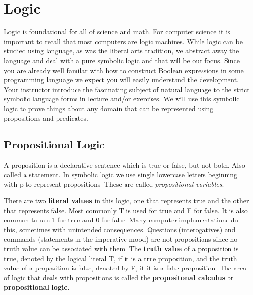\chapter {Logic}
Logic is foundational for all of science and math. For computer science it is important to recall that most computers are logic machines. While logic can be studied using language, as was the liberal arts tradition, we abstract away the language and deal with a pure symbolic logic and that will be our focus. Since you are already well familar with how to construct Boolean expressions in some programming language we expect you will easily understand the development. Your instructor introduce the fascinating subject of natural language to the strict symbolic language forms in lecture and/or exercises. We will use this symbolic logic to prove things about any domain that can be represented using propositions and predicates.


\section {Propositional Logic}
\begin {definition}[Proposition] 
A proposition is a declarative sentence which is true or false, but not both. Also called a statement. In symbolic logic we use single lowercase letters beginning with p to represent propositions. These are called \textit{propositional variables}.
\end {definition}


\begin{notes}
 There are two \textbf{literal values} in this logic, one that represents true and the other that represents false. Most commonly T is used for true and F for false. It is also common to use 1 for true and 0 for false. Many computer implementations do this, sometimes with unintended consequences. Questions (interogatives) and commands (statements in the imperative mood) are not propositions since no truth value can be associated with them. The \textbf{truth value} of a proposition is true, denoted by the logical literal T, if it is a true proposition, and the truth value of a proposition is false, denoted by F, it it is a false proposition. The area of logic that deals with propositions is called the \textbf{propositonal calculus} or \textbf{propositional logic}. 
\end{notes}

